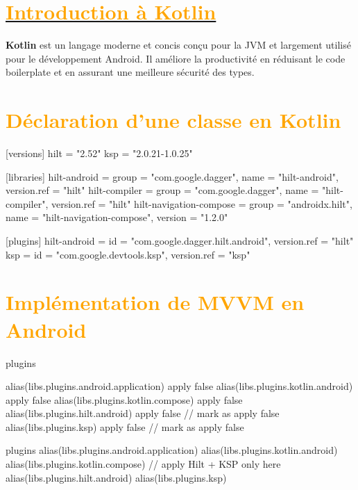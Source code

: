 \section{\hyperref[sec:summary]{\textcolor{orange}{Introduction à Kotlin}}}\label{sec:intro}

\textbf{Kotlin} est un langage moderne et concis conçu pour la JVM et largement utilisé pour le développement Android. Il améliore la productivité en réduisant le code boilerplate et en assurant une meilleure sécurité des types.

\section{\textcolor{orange}{Déclaration d'une classe en Kotlin}}\label{sec:classes}
\begin{ktlst}

[versions]
  hilt = "2.52"
  ksp = "2.0.21-1.0.25"

[libraries]
  hilt-android = { group = "com.google.dagger", name = "hilt-android", version.ref = "hilt" }
  hilt-compiler = { group = "com.google.dagger", name = "hilt-compiler", version.ref = "hilt" }
  hilt-navigation-compose = { group = "androidx.hilt", name = "hilt-navigation-compose", version = "1.2.0" }

[plugins]
  hilt-android = { id = "com.google.dagger.hilt.android", version.ref = "hilt" }
  ksp = { id = "com.google.devtools.ksp", version.ref = "ksp" }

\end{ktlst}

\section{\textcolor{orange}{Implémentation de MVVM en Android}}\label{sec:mvvm}
\begin{ktlst}
plugins {
    alias(libs.plugins.android.application) apply false
    alias(libs.plugins.kotlin.android) apply false
    alias(libs.plugins.kotlin.compose) apply false
    alias(libs.plugins.hilt.android) apply false   //  mark as apply false
    alias(libs.plugins.ksp) apply false           //  mark as apply false

}
\end{ktlst}

\begin{ktlst}
plugins {
    alias(libs.plugins.android.application)
    alias(libs.plugins.kotlin.android)
    alias(libs.plugins.kotlin.compose)
    //  apply Hilt + KSP only here
    alias(libs.plugins.hilt.android)
    alias(libs.plugins.ksp)
}
\end{ktlst}

